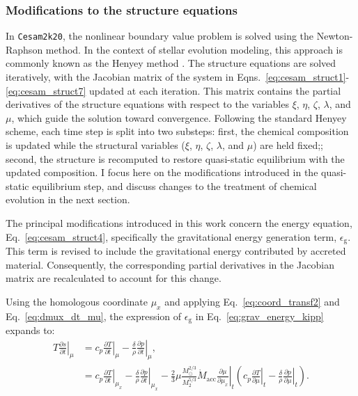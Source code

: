 \documentclass[12pt,a4paper]{article}
\newcommand{\mr}{\mathrm}
\newcommand{\pfird}[2][]{\frac{\partial#1}{\partial#2}}
\begin{document}
\subsubsection{Modifications to the structure equations}
\label{sec:accretion_struct_eq}

In \texttt{Cesam2k20}, the nonlinear boundary value problem is solved using the Newton-Raphson method. In the context of stellar evolution modeling, this approach is commonly known as the Henyey method \parencite{HenyeyEtAl1959}. The structure equations are solved iteratively, with the Jacobian matrix of the system in Eqns.~\eqref{eq:cesam_struct1}-\eqref{eq:cesam_struct7} updated at each iteration. This matrix contains the partial derivatives of the structure equations with respect to the variables $\xi$, $\eta$, $\zeta$, $\lambda$, and $\mu$, which guide the solution toward convergence. Following the standard Henyey scheme, each time step is split into two substeps: first, the chemical composition is updated while the structural variables ($\xi$, $\eta$, $\zeta$, $\lambda$, and $\mu$) are held fixed;; second, the structure is recomputed to restore quasi-static equilibrium with the updated composition. I focus here on the modifications introduced in the quasi-static equilibrium step, and discuss changes to the treatment of chemical evolution in the next section.

The principal modifications introduced in this work concern the energy equation, Eq.~\eqref{eq:cesam_struct4}, specifically the gravitational energy generation term, $\epsilon_\mr{g}$. This term is revised to include the gravitational energy contributed by accreted material. Consequently, the corresponding partial derivatives in the Jacobian matrix are recalculated to account for this change.

Using the homologous coordinate $\mu_x$ and applying Eq.~\eqref{eq:coord_transf2} and Eq.~\eqref{eq:dmux_dt_mu}, the expression of $\epsilon_\mr{g}$ in Eq.~\eqref{eq:grav_energy_kipp} expands to:
\begin{align}
  T\left.\pfird[s]{t}\right|_\mu &= c_p\left.\pfird[T]{t}\right|_\mu - \frac{\delta}{\rho}\left.\pfird[p]{t}\right|_\mu, \nonumber\\
  &= c_p\left.\pfird[T]{t}\right|_{\mu_x} - \frac{\delta}{\rho}\left.\pfird[p]{t}\right|_{\mu_x} - 
  \frac{2}{3}\mu\frac{M_\odot^{2/3}}{M_2^{5/3}}\dot{M}_\mr{acc}\left.\pfird[\mu]{\mu_x}\right|_t\left(c_p\left.\pfird[T]{\mu}\right|_t - \frac{\delta}{\rho}\left.\pfird[p]{\mu}\right|_t\right). \label{eq:grav_energy_kipp_mux}
\end{align}
\end{document}
